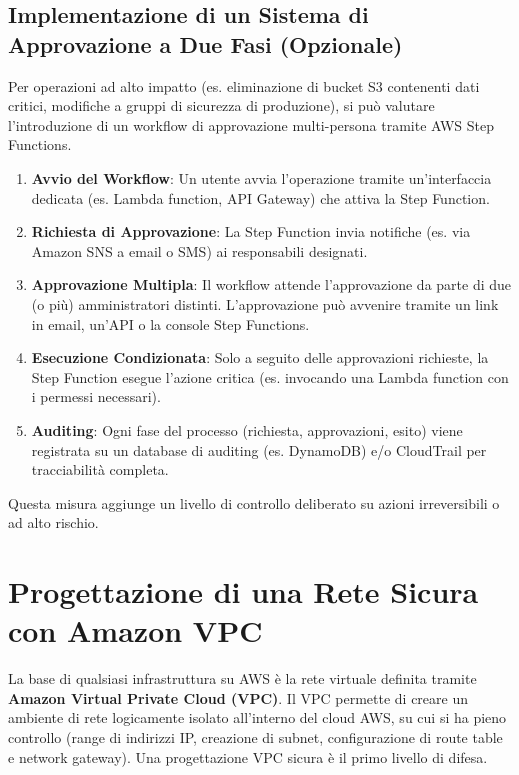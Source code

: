 \subsection{Implementazione di un Sistema di Approvazione a Due Fasi (Opzionale)}

Per operazioni ad alto impatto (es. eliminazione di bucket S3 contenenti dati critici, modifiche a gruppi di sicurezza di produzione), si può valutare l'introduzione di un workflow di approvazione multi-persona tramite AWS Step Functions.
\begin{enumerate}
    \item \textbf{Avvio del Workflow}: Un utente avvia l'operazione tramite un'interfaccia dedicata (es. Lambda function, API Gateway) che attiva la Step Function.
    \item \textbf{Richiesta di Approvazione}: La Step Function invia notifiche (es. via Amazon SNS a email o SMS) ai responsabili designati.
    \item \textbf{Approvazione Multipla}: Il workflow attende l'approvazione da parte di due (o più) amministratori distinti. L'approvazione può avvenire tramite un link in email, un'API o la console Step Functions.
    \item \textbf{Esecuzione Condizionata}: Solo a seguito delle approvazioni richieste, la Step Function esegue l'azione critica (es. invocando una Lambda function con i permessi necessari).
    \item \textbf{Auditing}: Ogni fase del processo (richiesta, approvazioni, esito) viene registrata su un database di auditing (es. DynamoDB) e/o CloudTrail per tracciabilità completa.
\end{enumerate}
Questa misura aggiunge un livello di controllo deliberato su azioni irreversibili o ad alto rischio.


\section{Progettazione di una Rete Sicura con Amazon VPC}
\label{sec:vpc-design}

La base di qualsiasi infrastruttura su AWS è la rete virtuale definita tramite \textbf{Amazon Virtual Private Cloud (VPC)}. Il VPC permette di creare un ambiente di rete logicamente isolato all'interno del cloud AWS, su cui si ha pieno controllo (range di indirizzi IP, creazione di subnet, configurazione di route table e network gateway). Una progettazione VPC sicura è il primo livello di difesa.

